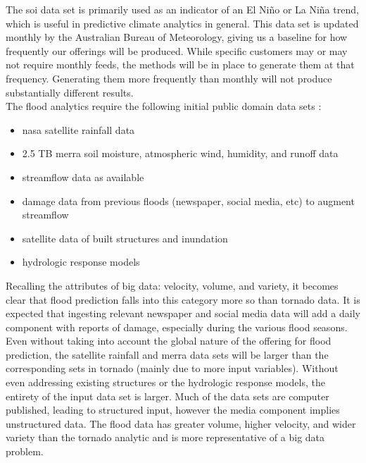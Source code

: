 The \gls{soi} data set is primarily used as an indicator of an El Niño or La Niña trend, which is useful in predictive climate analytics in general. This data set is updated monthly by the Australian Bureau of Meteorology, giving us a baseline for how frequently our \climatedge offerings will be produced. While specific customers may or may not require monthly feeds, the methods will be in place to generate them at that frequency. Generating them more frequently than monthly will not produce substantially different results.\\

The flood analytics require the following initial public domain data sets \cite{walker}:
\begin{itemize}
    \item \gls{nasa} satellite rainfall data
    \item 2.5 TB \gls{merra} soil moisture, atmospheric wind, humidity, and runoff data
    \item streamflow data as available
    \item damage data from previous floods (newspaper, social media, etc) to augment streamflow
    \item satellite data of built structures and inundation
    \item hydrologic response models
\end{itemize}
Recalling the attributes of big data: velocity, volume, and variety, it becomes clear that flood prediction falls into this category more so than tornado data. It is expected that ingesting relevant newspaper and social media data will add a daily component with reports of damage, especially during the various flood seasons. Even without taking into account the global nature of the offering for flood prediction, the satellite rainfall and \gls{merra} data sets will be larger than the corresponding sets in tornado (mainly due to more input variables). Without even addressing existing structures or the hydrologic response models, the entirety of the input data set is larger. Much of the data sets are computer published, leading to structured input, however the media component implies unstructured data. The flood data has greater volume, higher velocity, and wider variety than the tornado analytic and is more representative of a big data problem.\\

